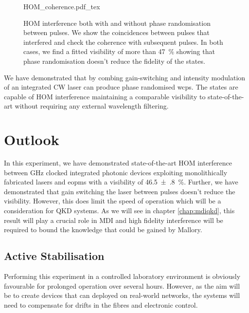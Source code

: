\begin{figure}[tp]
	\centering
	\tiny
	\def\svgwidth{\textwidth} 
	{HOM_coherence.pdf_tex}
	\caption[HOM interference with and without phase randomisation]{\ac{HOM} interference both with and without phase randomisation between pulses. We show the coincidences between pulses that interfered and check the coherence with subsequent pulses. In both cases, we find a fitted visibility of more than \SI{47}{\%} showing that phase randomisation doesn't reduce the fidelity of the states.}
	\label{fig:HOM_coherence}
\end{figure}

We have demonstrated that by combing gain-switching and intensity modulation of an integrated \ac{CW} laser can produce phase randomised \acp{wcp}. The states are capable of \ac{HOM} interference maintaining a comparable visibility to state-of-the-art without requiring any external wavelength filtering.

\section{Outlook}

In this experiment, we have demonstrated state-of-the-art \acl{HOM} interference between GHz clocked integrated photonic devices exploiting monolithically fabricated lasers and \acp{eopm} with a visibility of \SI{46.5(8)}{\%}. Further, we have demonstrated that gain switching the laser between pulses doesn't reduce the visibility. However, this does limit the speed of operation which will be a consideration for \ac{QKD} systems. As we will see in chapter \ref{chap:mdiqkd}, this result will play a crucial role in \ac{MDI} and high fidelity interference will be required to bound the knowledge that could be gained by Mallory.

\subsection{Active Stabilisation}

Performing this experiment in a controlled laboratory environment is obviously favourable for prolonged operation over several hours. However, as the aim will be to create devices that can deployed on real-world networks, the systems will need to compensate for drifts in the fibres and electronic control.



